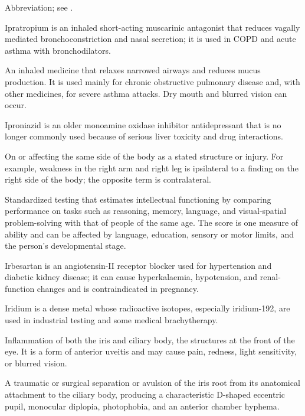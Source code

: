  Abbreviation; see .

 Ipratropium is an inhaled short-acting muscarinic antagonist that reduces vagally mediated bronchoconstriction and nasal secretion; it is used in COPD and acute asthma with bronchodilators.

 An inhaled medicine that relaxes narrowed airways and reduces mucus production. It is used mainly for chronic obstructive pulmonary disease and, with other medicines, for severe asthma attacks. Dry mouth and blurred vision can occur.

 Iproniazid is an older monoamine oxidase inhibitor antidepressant that is no longer commonly used because of serious liver toxicity and drug interactions.

 On or affecting the same side of the body as a stated structure or injury. For example, weakness in the right arm and right leg is ipsilateral to a finding on the right side of the body; the opposite term is contralateral.

 Standardized testing that estimates intellectual functioning by comparing performance on tasks such as reasoning, memory, language, and visual-spatial problem-solving with that of people of the same age. The score is one measure of ability and can be affected by language, education, sensory or motor limits, and the person's developmental stage.

 Irbesartan is an angiotensin-II receptor blocker used for hypertension and diabetic kidney disease; it can cause hyperkalaemia, hypotension, and renal-function changes and is contraindicated in pregnancy.

 Iridium is a dense metal whose radioactive isotopes, especially iridium-192, are used in industrial testing and some medical brachytherapy.

 Inflammation of both the iris and ciliary body, the structures at the front of the eye. It is a form of anterior uveitis and may cause pain, redness, light sensitivity, or blurred vision.

 A traumatic or surgical separation or avulsion of the iris root from its anatomical attachment to the ciliary body, producing a characteristic D-shaped eccentric pupil, monocular diplopia, photophobia, and an anterior chamber hyphema.

